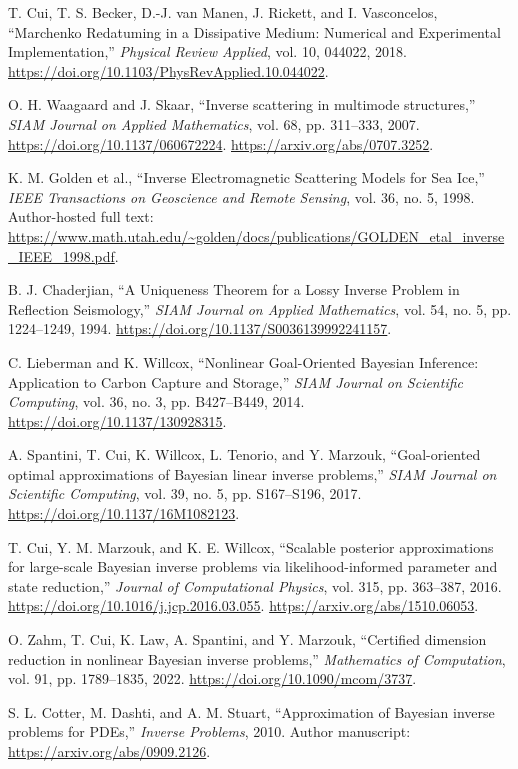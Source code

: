  T. Cui, T. S. Becker, D.-J. van Manen, J. Rickett, and I. Vasconcelos, ``Marchenko Redatuming in a Dissipative Medium: Numerical and Experimental Implementation,'' \emph{Physical Review Applied}, vol. 10, 044022, 2018. \url{https://doi.org/10.1103/PhysRevApplied.10.044022}.

 O. H. Waagaard and J. Skaar, ``Inverse scattering in multimode structures,'' \emph{SIAM Journal on Applied Mathematics}, vol. 68, pp. 311--333, 2007. \url{https://doi.org/10.1137/060672224}. \url{https://arxiv.org/abs/0707.3252}.

 K. M. Golden et al., ``Inverse Electromagnetic Scattering Models for Sea Ice,'' \emph{IEEE Transactions on Geoscience and Remote Sensing}, vol. 36, no. 5, 1998. Author-hosted full text: \url{https://www.math.utah.edu/~golden/docs/publications/GOLDEN_etal_inverse_IEEE_1998.pdf}.

 B. J. Chaderjian, ``A Uniqueness Theorem for a Lossy Inverse Problem in Reflection Seismology,'' \emph{SIAM Journal on Applied Mathematics}, vol. 54, no. 5, pp. 1224--1249, 1994. \url{https://doi.org/10.1137/S0036139992241157}.

 C. Lieberman and K. Willcox, ``Nonlinear Goal-Oriented Bayesian Inference: Application to Carbon Capture and Storage,'' \emph{SIAM Journal on Scientific Computing}, vol. 36, no. 3, pp. B427--B449, 2014. \url{https://doi.org/10.1137/130928315}.

 A. Spantini, T. Cui, K. Willcox, L. Tenorio, and Y. Marzouk, ``Goal-oriented optimal approximations of Bayesian linear inverse problems,'' \emph{SIAM Journal on Scientific Computing}, vol. 39, no. 5, pp. S167--S196, 2017. \url{https://doi.org/10.1137/16M1082123}.

 T. Cui, Y. M. Marzouk, and K. E. Willcox, ``Scalable posterior approximations for large-scale Bayesian inverse problems via likelihood-informed parameter and state reduction,'' \emph{Journal of Computational Physics}, vol. 315, pp. 363--387, 2016. \url{https://doi.org/10.1016/j.jcp.2016.03.055}. \url{https://arxiv.org/abs/1510.06053}.

 O. Zahm, T. Cui, K. Law, A. Spantini, and Y. Marzouk, ``Certified dimension reduction in nonlinear Bayesian inverse problems,'' \emph{Mathematics of Computation}, vol. 91, pp. 1789--1835, 2022. \url{https://doi.org/10.1090/mcom/3737}.

 S. L. Cotter, M. Dashti, and A. M. Stuart, ``Approximation of Bayesian inverse problems for PDEs,'' \emph{Inverse Problems}, 2010. Author manuscript: \url{https://arxiv.org/abs/0909.2126}.

